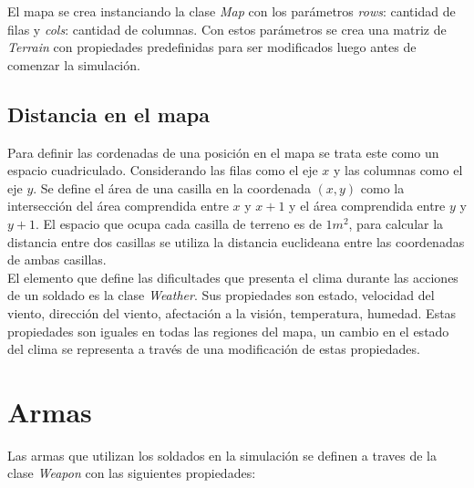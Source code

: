 \documentclass[twoside]{article}
\begin{document}
		El mapa se crea instanciando la clase \emph{Map} con los par\'ametros \emph{rows}: cantidad de filas y \emph{cols}: cantidad de columnas. Con estos par\'ametros se crea una matriz de \emph{Terrain} con propiedades predefinidas para ser modificados luego antes de comenzar la simulaci\'on.
		
		\subsection{Distancia en el mapa}
		
		Para definir las cordenadas de una posici\'on en el mapa se trata este como un espacio cuadriculado. Considerando las filas como el eje $x$ y las columnas como el eje $y$. Se define el \'area de una casilla en la coordenada $(x, y)$ como la intersecci\'on del \'area comprendida entre $x$ y $x+1$ y el \'area comprendida entre $y$ y $y+1$.
		El espacio que ocupa cada casilla de terreno es de $1 m^2$, para calcular la distancia entre dos casillas se utiliza la distancia euclideana entre las coordenadas de ambas casillas.\\
		
		El elemento que define las dificultades que presenta el clima durante las acciones de un soldado es la clase \emph{Weather}. Sus propiedades son estado, velocidad del viento, direcci\'on del viento, afectaci\'on a la visi\'on, temperatura, humedad. Estas propiedades son iguales en todas las regiones del mapa, un cambio en el estado del clima se representa a trav\'es de una modificaci\'on de estas propiedades.
		
		\section{Armas}
		
		Las armas que utilizan los soldados en la simulaci\'on se definen a traves de la clase \emph{Weapon} con las siguientes propiedades: 
		
\end{document}
